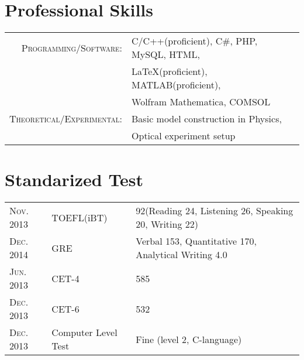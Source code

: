 \documentclass[ENG]{SealZhang}
\begin{document}
\section{Professional Skills}
\begin{tabular}{rl}
 \textsc{Programming/Software:}&C/C++(proficient), C\#, PHP, MySQL, HTML, \\& \LaTeX (proficient), MATLAB(proficient),\\ & Wolfram Mathematica, COMSOL\\
\textsc{Theoretical/Experimental:}&Basic model construction in Physics, \\&Optical experiment setup\\
\end{tabular}

\section{Standarized Test}
\begin{tabular}{l|ll}
 \textsc{Nov. 2013} & TOEFL(iBT) & 92(Reading 24, Listening 26, Speaking 20, Writing 22) \\
 \textsc{Dec. 2014} & GRE & Verbal 153, Quantitative 170, Analytical Writing 4.0 \\
 \textsc{Jun. 2013} & CET-4 & 585 \\
 \textsc{Dec. 2013} & CET-6 & 532 \\
 \textsc{Dec. 2013} & Computer Level Test & Fine (level 2, C-language) \\
\end{tabular}

\clearpage
\end{document}

